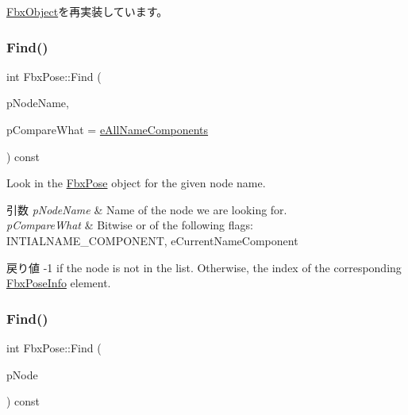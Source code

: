 \hyperlink{class_fbx_object_a123e084d9b32b29c28af6384b7c3c608}{Fbx\+Object}を再実装しています。

\mbox{\label{class_fbx_pose_a427820ec28ffde99a648991078d6ed1c}} 
\subsubsection{\texorpdfstring{Find()}{Find()}\hspace{0.1cm}{\footnotesize\ttfamily [1/2]}}
{\footnotesize\ttfamily int Fbx\+Pose\+::\+Find (\begin{DoxyParamCaption}\item[{const \hyperlink{class_fbx_name_handler}{Fbx\+Name\+Handler} \&}]{p\+Node\+Name,  }\item[{char}]{p\+Compare\+What = {\ttfamily \hyperlink{class_fbx_pose_a0ab145961bb4163251d1a29f2fe37364abc7067764b4a5c2daecef3ac215124ff}{e\+All\+Name\+Components}} }\end{DoxyParamCaption}) const}

Look in the \hyperlink{class_fbx_pose}{Fbx\+Pose} object for the given node name. 
\begin{DoxyParams}{引数}
{\em p\+Node\+Name} & Name of the node we are looking for. \\
\hline
{\em p\+Compare\+What} & Bitwise or of the following flags\+: I\+N\+T\+I\+A\+L\+N\+A\+M\+E\+\_\+\+C\+O\+M\+P\+O\+N\+E\+NT, e\+Current\+Name\+Component \\
\hline
\end{DoxyParams}
\begin{DoxyReturn}{戻り値}
-\/1 if the node is not in the list. Otherwise, the index of the corresponding \hyperlink{struct_fbx_pose_info}{Fbx\+Pose\+Info} element. 
\end{DoxyReturn}
\mbox{\label{class_fbx_pose_a3314b102674679ed6ee9f6bdf386739e}} 
\subsubsection{\texorpdfstring{Find()}{Find()}\hspace{0.1cm}{\footnotesize\ttfamily [2/2]}}
{\footnotesize\ttfamily int Fbx\+Pose\+::\+Find (\begin{DoxyParamCaption}\item[{const \hyperlink{class_fbx_node}{Fbx\+Node} $\ast$}]{p\+Node }\end{DoxyParamCaption}) const}


